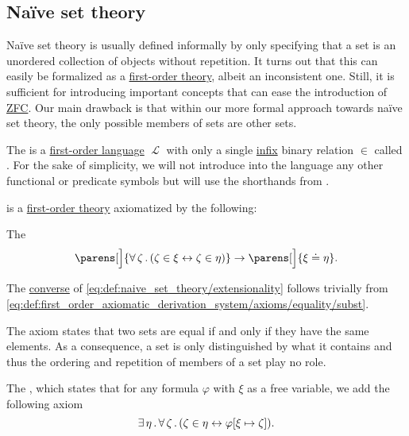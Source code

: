 \subsection{Na\"ive set theory}\label{subsec:naive_set_theory}

Na\"ive set theory is usually defined informally by only specifying that a set is an unordered collection of objects without repetition. It turns out that this can easily be formalized as a \hyperref[def:first_order_theory]{first-order theory}, albeit an inconsistent one. Still, it is sufficient for introducing important concepts that can ease the introduction of \hyperref[def:zfc]{ZFC}. Our main drawback is that within our more formal approach towards na\"ive set theory, the only possible members of sets are other sets.

\begin{definition}\label{def:naive_set_theory}
  The  is a \hyperref[def:first_order_syntax]{first-order language} \( \mscrL \) with only a single \hyperref[rem:first_order_formula_conventions/infix]{infix} binary relation \( \in \) called . For the sake of simplicity, we will not introduce into the language any other functional or predicate symbols but will use the shorthands from .

   is a \hyperref[def:first_order_theory]{first-order theory} axiomatized by the following:
  \begin{thmenum}
     The 
    \begin{equation}\label{eq:def:naive_set_theory/extensionality}
      \parens[\Big]{ \qforall \zeta (\zeta \in \xi \leftrightarrow \zeta \in \eta) } \rightarrow \parens[\Big]{ \xi \doteq \eta }.
    \end{equation}

    The \hyperref[def:binary_relation/converse]{converse} of \eqref{eq:def:naive_set_theory/extensionality} follows trivially from \eqref{eq:def:first_order_axiomatic_derivation_system/axioms/equality/subst}.

    The axiom states that two sets are equal if and only if they have the same elements. As a consequence, a set is only distinguished by what it contains and thus the ordering and repetition of members of a set play no role.

     The , which states that for any formula \( \varphi \) with \( \xi \) as a free variable, we add the following axiom
    \begin{equation}\label{eq:def:naive_set_theory/unrestricted_comprehension}
      \exists \thinspace \eta \thinspace . \thinspace \forall \thinspace \zeta \thinspace . \thinspace (\zeta \in \eta \leftrightarrow \varphi[\xi \mapsto \zeta]).
    \end{equation}


\end{thmenum}
\end{definition}
